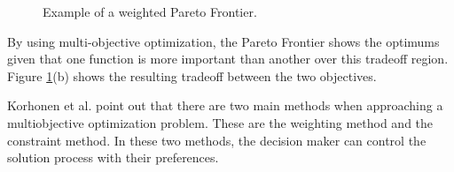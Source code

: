 \begin{figure}%
    \centering
    \qquad
    \caption{Example of a weighted Pareto Frontier.}%
    \label{visualex}
\end{figure}

By using multi-objective optimization, the Pareto Frontier shows the optimums given that one function is more important than another over this tradeoff region. Figure \ref{visualex}(b) shows the resulting tradeoff between the two objectives.


\par
Korhonen et al. \cite{MultOptCS} point out that there are two main methods when approaching a multiobjective optimization problem. These are the weighting method and the constraint method. In these two methods, the decision maker can control the solution process with their preferences.\par
